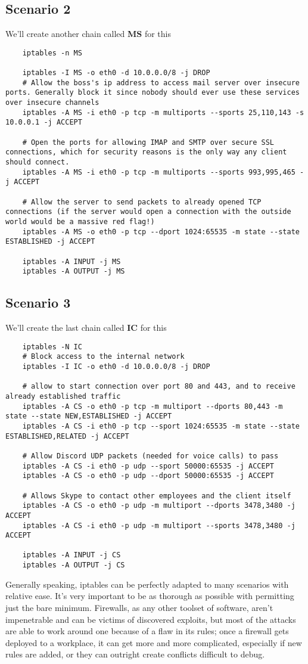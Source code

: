 \documentclass{article}
\begin{document}
\subsection*{Scenario 2}
We'll create another chain called \textbf{MS} for this
\begin{lstlisting}
    iptables -n MS

    iptables -I MS -o eth0 -d 10.0.0.0/8 -j DROP
    # Allow the boss's ip address to access mail server over insecure ports. Generally block it since nobody should ever use these services over insecure channels
    iptables -A MS -i eth0 -p tcp -m multiports --sports 25,110,143 -s 10.0.0.1 -j ACCEPT

    # Open the ports for allowing IMAP and SMTP over secure SSL connections, which for security reasons is the only way any client should connect. 
    iptables -A MS -i eth0 -p tcp -m multiports --sports 993,995,465 -j ACCEPT
    
    # Allow the server to send packets to already opened TCP connections (if the server would open a connection with the outside world would be a massive red flag!)
    iptables -A MS -o eth0 -p tcp --dport 1024:65535 -m state --state ESTABLISHED -j ACCEPT

    iptables -A INPUT -j MS
    iptables -A OUTPUT -j MS
\end{lstlisting}

\subsection*{Scenario 3}
We'll create the last chain called \textbf{IC} for this
\begin{lstlisting}
    iptables -N IC
    # Block access to the internal network
    iptables -I IC -o eth0 -d 10.0.0.0/8 -j DROP
        
    # allow to start connection over port 80 and 443, and to receive already established traffic
    iptables -A CS -o eth0 -p tcp -m multiport --dports 80,443 -m state --state NEW,ESTABLISHED -j ACCEPT
    iptables -A CS -i eth0 -p tcp --sport 1024:65535 -m state --state ESTABLISHED,RELATED -j ACCEPT

    # Allow Discord UDP packets (needed for voice calls) to pass
    iptables -A CS -i eth0 -p udp --sport 50000:65535 -j ACCEPT
    iptables -A CS -o eth0 -p udp --dport 50000:65535 -j ACCEPT

    # Allows Skype to contact other employees and the client itself
    iptables -A CS -o eth0 -p udp -m multiport --dports 3478,3480 -j ACCEPT
    iptables -A CS -i eth0 -p udp -m multiport --sports 3478,3480 -j ACCEPT

    iptables -A INPUT -j CS
    iptables -A OUTPUT -j CS
\end{lstlisting}
Generally speaking, iptables can be perfectly adapted to many scenarios with relative ease. It's very important to be as thorough as possible with permitting just the bare minimum. Firewalls, as any other toolset of software, aren't impenetrable and can be victims of discovered exploits, but most of the attacks are able to work around one because of a flaw in its rules; once a firewall gets deployed to a workplace, it can get more and more complicated, especially if new rules are added, or they can outright create conflicts difficult to debug.
\end{document}
